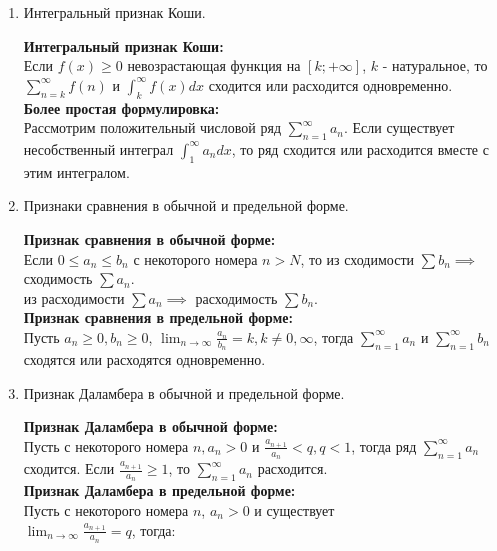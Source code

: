 \documentclass[a4paper, 12pt]{article}
\begin{document}
\begin{enumerate}
	\item Интегральный признак Коши. \\
	      \begin{mdframed}
		      \textbf{Интегральный признак Коши:} \\
		      Если $f(x) \ge 0$ невозрастающая функция на $[k; + \infty]$,  $k$ - натуральное, то  $\sum_{n=k}^{\infty} f(n)$ и $\int_{k}^{\infty}f(x)dx$ сходится или расходится одновременно. \\
		      \textbf{Более простая формулировка:} \\
		      Рассмотрим положительный числовой ряд $\sum_{n=1}^{\infty} a_n$. Если существует несобственный интеграл $\int_{1}^{\infty} a_n dx$, то ряд сходится или расходится вместе с этим интегралом.
	      \end{mdframed}
	\item Признаки сравнения в обычной и предельной форме. \\
	      \begin{mdframed}
		      \textbf{Признак сравнения в обычной форме:} \\
		      Если $0 \le a_n \le b_n$ с некоторого номера $n > N$, то из сходимости $\sum b_n \implies$ сходимость $\sum a_n$. \\
		      из расходимости $\sum a_n \implies$ расходимость $\sum b_n$. \\
		      \textbf{Признак сравнения в предельной форме:} \\
		      Пусть $a_n \ge 0, b_n \ge  0$, $\lim_{n \to \infty} \frac{a_n}{b_n} = k, k \neq 0, \infty$, тогда $\sum_{n=1}^{\infty} a_n$ и $\sum_{n=1}^{\infty} b_n$ сходятся или расходятся одновременно.
	      \end{mdframed}
	\item Признак Даламбера в обычной и предельной форме. \\
	      \begin{mdframed}
		      \textbf{Признак Даламбера в обычной форме:} \\
		      Пусть с некоторого номера $n, a_n > 0$ и  $\frac{a_{n+1}}{a_n} < q, q < 1$, тогда ряд $\sum_{n=1}^{\infty} a_n$ сходится.
		      Если $\frac{a_{n+1}}{a_n} \ge 1$, то $\sum_{n=1}^{\infty} a_n$ расходится. \\
		      \textbf{Признак Даламбера в предельной форме:} \\
		      Пусть с некоторого номера $n$,  $a_n > 0$ и существует \\  $\lim_{n \to \infty} \frac{a_{n+1}}{a_n} = q$, тогда:
		      \begin{itemize}

\end{itemize}
\end{mdframed}
\end{enumerate}
\end{document}
